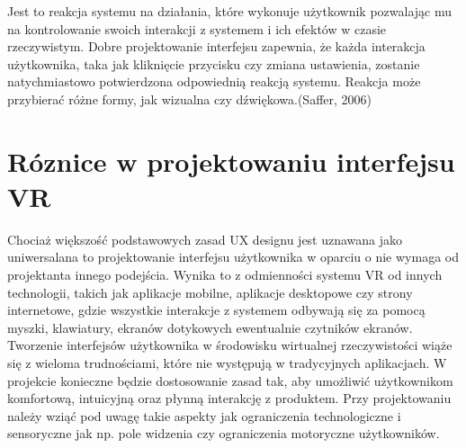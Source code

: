 Jest to reakcja systemu na działania, które wykonuje użytkownik pozwalając mu na kontrolowanie swoich interakcji z systemem i ich efektów w czasie rzeczywistym. Dobre projektowanie interfejsu zapewnia, że każda interakcja użytkownika, taka jak kliknięcie przycisku czy zmiana ustawienia, zostanie natychmiastowo potwierdzona odpowiednią reakcją systemu. Reakcja może przybierać różne formy, jak wizualna czy dźwiękowa.(Saffer, 2006)


\section{Róznice w projektowaniu interfejsu VR}
Chociaż większość podstawowych zasad UX designu jest uznawana jako uniwersalana to projektowanie interfejsu użytkownika w oparciu o nie wymaga od projektanta innego podejścia. Wynika to z odmienności systemu VR od innych technologii, takich jak aplikacje mobilne, aplikacje desktopowe czy strony internetowe, gdzie wszystkie interakcje z systemem odbywają się za pomocą myszki, klawiatury, ekranów dotykowych ewentualnie czytników ekranów. Tworzenie interfejsów użytkownika w środowisku wirtualnej rzeczywistości wiąże się z wieloma trudnościami, które nie występują w tradycyjnych aplikacjach. W projekcie konieczne będzie dostosowanie zasad tak, aby umożliwić użytkownikom komfortową, intuicyjną oraz płynną interakcję z produktem. Przy projektowaniu należy wziąć pod uwagę takie aspekty jak ograniczenia technologiczne i sensoryczne jak np. pole widzenia czy ograniczenia motoryczne użytkowników. 

